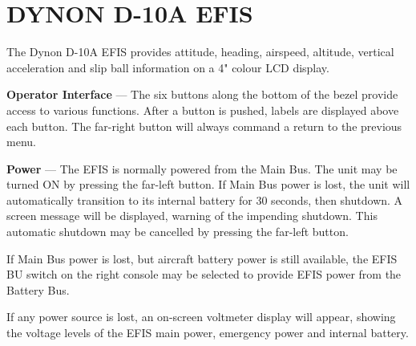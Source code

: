 \section{DYNON D-10A EFIS} 

The Dynon D-10A EFIS provides attitude, heading, airspeed, altitude, vertical acceleration and slip ball information on a 4" colour LCD display.

\textbf{Operator Interface} --- The six buttons along the bottom of the bezel provide access to various functions. After a button is pushed, labels are displayed above each button. The far-right button will always command a return to the previous menu.

\textbf{Power} --- The EFIS is normally powered from the Main Bus. The unit may be turned ON by pressing the far-left button. If Main Bus power is lost, the unit will automatically transition to its internal battery for 30 seconds, then shutdown. A screen message will be displayed, warning of the impending shutdown. This automatic shutdown may be cancelled by pressing the far-left button.

If Main Bus power is lost, but aircraft battery power is still available, the EFIS BU switch on the right console may be selected to provide EFIS power from the Battery Bus.

If any power source is lost, an on-screen voltmeter display will appear, showing the voltage levels of the EFIS main power, emergency power and internal battery.

